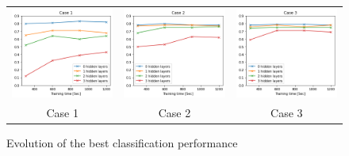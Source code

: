 \documentclass[letterpaper, 10 pt, conference]{ieeeconf}  %
\begin{document}
\begin{figure}[tbh]
    \centering
    \begin{centering}
    \begin{tabular}{ccc}
        \includegraphics[width=0.30\linewidth, trim=0cm 0cm 0cm 0.65cm, clip=true]{10trials/evolMaxC1}&
        \includegraphics[width=0.30\linewidth, trim=0cm 0cm 0cm 0.65cm, clip=true]{10trials/evolMaxC2}&
        \includegraphics[width=0.30\linewidth, trim=0cm 0cm 0cm 0.65cm, clip=true]{10trials/evolMaxC3}\\
        Case 1 & Case 2 & Case 3
        \end{tabular}
     \end{centering}
     \caption{Evolution of the best classification performance}
     \label{fig:evHlayerBest}
    \vspace{-10pt}
\end{figure}
\end{document}

